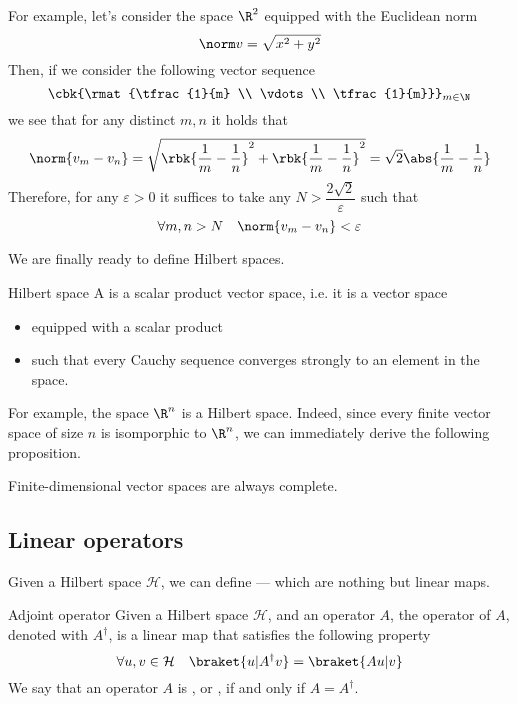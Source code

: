 \documentclass[a4paper, 12pt]{report}
\begin{document}
For example, let's consider the space $\R^2$ equipped with the Euclidean norm $$\norm v =  \sqrt{x^2 + y^2}$$ Then, if we consider the following vector sequence $$\cbk{\rmat{\tfrac{1}{m} \\ \vdots \\ \tfrac{1}{m}}}_{m \in \N}$$ we see that for any distinct $m, n$ it holds that $$\norm{v_m - v_n} = \sqrt{\rbk{\dfrac{1}{m} -\dfrac{1}{n}}^2 + \rbk{\dfrac{1}{m} -\dfrac{1}{n}}^2} = \sqrt 2 \abs{\dfrac{1}{m} -\dfrac{1}{n}}$$ Therefore, for any $\varepsilon > 0$ it suffices to take any $N > \dfrac{2 \sqrt 2}{\varepsilon}$ such that $$\forall m, n > N \quad \norm{v_m - v_n} < \varepsilon$$

We are finally ready to define Hilbert spaces.

\begin{frameddefn}{Hilbert space}
	A  is a  scalar product vector space, i.e. it is a vector space

	\begin{itemize}
		\item equipped with a scalar product
		\item such that every Cauchy sequence converges strongly to an element in the space.
	\end{itemize}
\end{frameddefn}

For example, the space $\R^n$ is a Hilbert space. Indeed, since every finite vector space of size $n$ is isomporphic to $\R^n$, we can immediately derive the following proposition.

\begin{framedprop}{}
	Finite-dimensional vector spaces are always complete.
\end{framedprop}

\subsection{Linear operators}

Given a Hilbert space $\mathcal H$, we can define  --- which are nothing but linear maps.

\begin{frameddefn}{Adjoint operator}
	Given a Hilbert space $\mathcal H$, and an operator $A$, the  operator of $A$, denoted with $A^\dag$, is a linear map that satisfies the following property $$\forall u, v \in \mathcal H \quad \braket{u|A^\dag v} = \braket{Au|v}$$ We say that an operator $A$ is , or , if and only if $A = A^\dag$.
\end{frameddefn}
\end{document}
